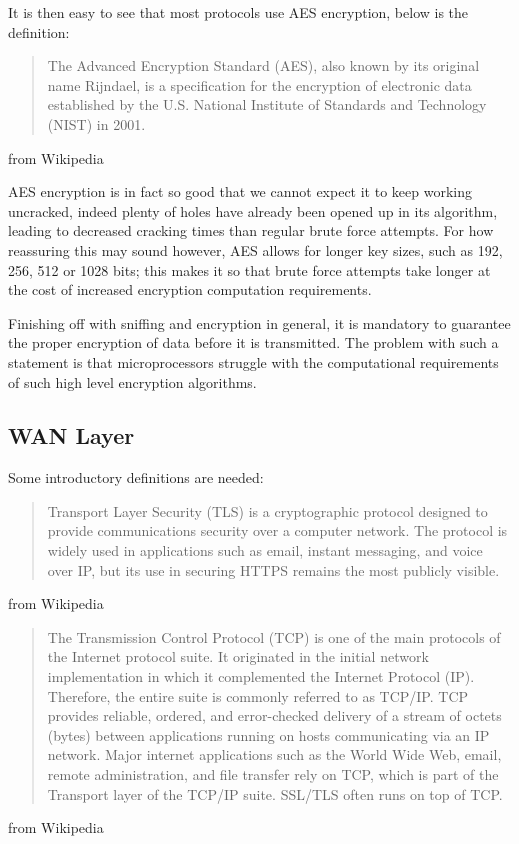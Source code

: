 \documentclass[11pt]{article}
\begin{document}
It is then easy to see that most protocols use AES encryption, below is the definition:
\begin{quote}
    The Advanced Encryption Standard (AES), also known by its original name Rijndael, is a specification for the encryption of electronic data established by the U.S. National Institute of Standards and Technology (NIST) in 2001.
\end{quote} from Wikipedia

AES encryption is in fact so good that we cannot expect it to keep working uncracked, indeed plenty of holes have already been opened up in its algorithm, leading to decreased cracking times than regular brute force attempts. For how reassuring this may sound however, AES allows for longer key sizes, such as 192, 256, 512 or 1028 bits; this makes it so that brute force attempts take longer at the cost of increased encryption computation requirements. \par \vspace{0.5 cm}

Finishing off with sniffing and encryption in general, it is mandatory to guarantee the proper encryption of data before it is transmitted. The problem with such a statement is that microprocessors struggle with the computational requirements of such high level encryption algorithms. \par \vspace{0.5 cm}

\subsection{WAN Layer}

Some introductory definitions are needed:

\begin{quote}
    Transport Layer Security (TLS) is a cryptographic protocol designed to provide communications security over a computer network. The protocol is widely used in applications such as email, instant messaging, and voice over IP, but its use in securing HTTPS remains the most publicly visible. 
\end{quote} from Wikipedia \par \vspace{0.5 cm}

\begin{quote}
    The Transmission Control Protocol (TCP) is one of the main protocols of the Internet protocol suite. It originated in the initial network implementation in which it complemented the Internet Protocol (IP). Therefore, the entire suite is commonly referred to as TCP/IP. TCP provides reliable, ordered, and error-checked delivery of a stream of octets (bytes) between applications running on hosts communicating via an IP network. Major internet applications such as the World Wide Web, email, remote administration, and file transfer rely on TCP, which is part of the Transport layer of the TCP/IP suite. SSL/TLS often runs on top of TCP. 
\end{quote} from Wikipedia \par \vspace{0.5 cm}
\end{document}
